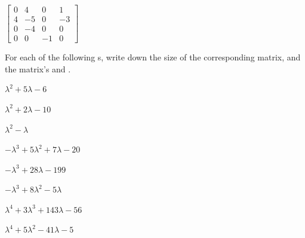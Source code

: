 \begin{exercise}
\begin{parts}
\item \(\begin{bmatrix} 0 & 4 & 0 & 1
\\4 & -5 & 0 & -3
\\0 & -4 & 0 & 0
\\0 & 0 & -1 & 0 \end{bmatrix}\)

\end{parts}
\end{exercise}








\begin{exercise} \label{ex:} 
For each of the following s, write down the size of the corresponding matrix, and the matrix's  and .
\begin{parts}
\item \(\lambda^2+5\lambda-6\)

\item \(\lambda^2+2\lambda-10\)

\item \(\lambda^2-\lambda\)

\item \(-\lambda^3+5\lambda^2+7\lambda-20\)

\item \(-\lambda^3+28\lambda-199\)

\item \(-\lambda^3+8\lambda^2-5\lambda\)

\item \(\lambda^4+3\lambda^3+143\lambda-56\)

\item \(\lambda^4+5\lambda^2-41\lambda-5\)

\end{parts}
\end{exercise}






